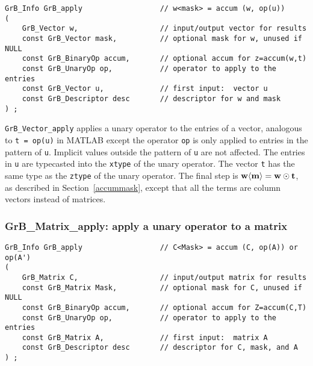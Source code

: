\documentclass[12pt]{article}
\begin{document}
\begin{mdframed}[userdefinedwidth=6in]
{\footnotesize
\begin{verbatim}
GrB_Info GrB_apply                  // w<mask> = accum (w, op(u))
(
    GrB_Vector w,                   // input/output vector for results
    const GrB_Vector mask,          // optional mask for w, unused if NULL
    const GrB_BinaryOp accum,       // optional accum for z=accum(w,t)
    const GrB_UnaryOp op,           // operator to apply to the entries
    const GrB_Vector u,             // first input:  vector u
    const GrB_Descriptor desc       // descriptor for w and mask
) ;
\end{verbatim} } \end{mdframed}

\verb'GrB_Vector_apply' applies a unary operator to the entries of a vector,
analogous to \verb't = op(u)'  in MATLAB except the operator \verb'op' is only
applied to entries in the pattern of \verb'u'.  Implicit values outside the
pattern of \verb'u' are not affected.  The entries in \verb'u' are typecasted
into the \verb'xtype' of the unary operator.  The vector \verb't' has the same
type as the \verb'ztype' of the unary operator.  The final step is ${\bf w
\langle m \rangle  = w \odot t}$, as described in Section~\ref{accummask},
except that all the terms are column vectors instead of matrices.

\newpage
\subsubsection{{\sf GrB\_Matrix\_apply:} apply a unary operator to a matrix}
\label{apply_matrix}

\begin{mdframed}[userdefinedwidth=6in]
{\footnotesize
\begin{verbatim}
GrB_Info GrB_apply                  // C<Mask> = accum (C, op(A)) or op(A')
(
    GrB_Matrix C,                   // input/output matrix for results
    const GrB_Matrix Mask,          // optional mask for C, unused if NULL
    const GrB_BinaryOp accum,       // optional accum for Z=accum(C,T)
    const GrB_UnaryOp op,           // operator to apply to the entries
    const GrB_Matrix A,             // first input:  matrix A
    const GrB_Descriptor desc       // descriptor for C, mask, and A
) ;
\end{verbatim} } \end{mdframed}
\end{document}
